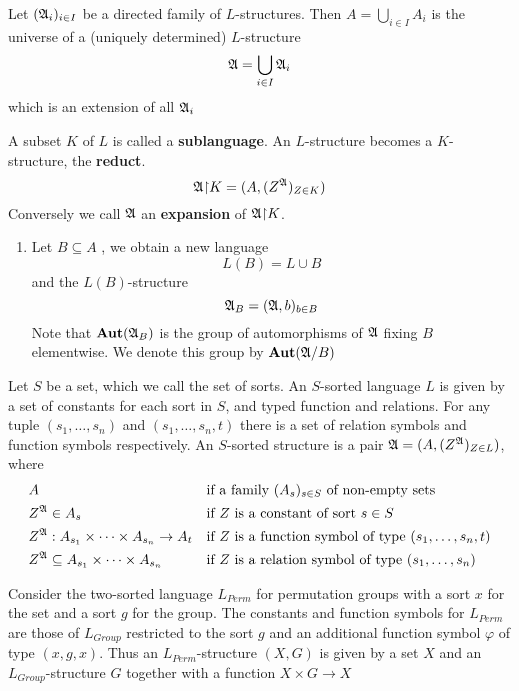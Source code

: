 \documentclass[11pt]{article}
\begin{document}
\begin{lemma}[]
Let \((\mathfrak{A}_i)_{i\in I}\) be a directed family of \(L\)-structures. Then
\(A=\bigcup_{i\in I}A_i\) is the universe of a (uniquely determined)
\(L\)-structure
\begin{equation*}
\mathfrak{A}=\bigcup_{i\in I}\mathfrak{A}_i
\end{equation*}
which is an extension of all \(\mathfrak{A}_i\)
\end{lemma}

A subset \(K\) of \(L\) is called a \textbf{sublanguage}. An \(L\)-structure becomes a
\(K\)-structure, the \textbf{reduct}.
\begin{equation*}
\mathfrak{A}\mathord{\upharpoonright} K=(A,(Z^{\mathfrak{A}})_{Z\in K})
\end{equation*}
Conversely we call \(\mathfrak{A}\) an \textbf{expansion} of \(\mathfrak{A}\mathord{\upharpoonright} K\).
\begin{enumerate}
\item Let \(B\subseteq A\) , we obtain a new language
\begin{equation*}
L(B)=L\cup B
\end{equation*}
and the \(L(B)\)-structure 
\begin{equation*}
\mathfrak{A}_B=(\mathfrak{A},b)_{b\in B}
\end{equation*}
Note that \(\operatorname{\textbf{Aut}}(\mathfrak{A}_B)\) is the group of automorphisms of \(\mathfrak{A}\) fixing
\(B\) elementwise. We denote this group by \(\operatorname{\textbf{Aut}}(\mathfrak{A}/B)\)
\end{enumerate}


Let \(S\) be a set, which we call the set of sorts. An \(S\)-sorted
language \(L\) is given by a set of constants for each sort in \(S\), and
typed function and relations. For any tuple \((s_1,\dots,s_n)\) and
\((s_1,\dots,s_n,t)\) there is a set of relation symbols and function
symbols respectively. An \(S\)-sorted structure is a pair
\(\mathfrak{A}=(A,(Z^{\mathfrak{A}})_{Z\in L})\), where 
\begin{alignat*}{2}      
&A&&\text{if a family $(A_s)_{s\in S}$ of non-empty sets}\\
&Z^{\mathfrak{A}}\in A_s&&\text{if $Z$ is a constant of sort $s\in S$}\\
&Z^{\mathfrak{A}}:A_{s_1}\times\dots\times A_{s_n}\to A_t&&\text{if $Z$ is a
function symbol of type $(s_1,\dots,s_n,t)$}\\
&Z^{\mathfrak{A}}\subseteq A_{s_1}\times\dots\times A_{s_n}&&\text{if $Z$ is a
relation symbol of type $(s_1,\dots,s_n)$}
\end{alignat*}

\begin{examplle}[]
Consider the two-sorted language \(L_{Perm}\) for permutation groups with a
sort \(x\) for the set and a sort \(g\) for the group. The constants and
function symbols for \(L_{Perm}\) are those of \(L_{Group}\) restricted to
the sort \(g\) and an additional function symbol \(\varphi\) of type \((x,g,x)\). Thus
an \(L_{Perm}\)-structure \((X,G)\) is given by a set \(X\) and an
\(L_{Group}\)-structure \(G\) together with a function \(X\times G\to X\)
\end{examplle}
\end{document}
